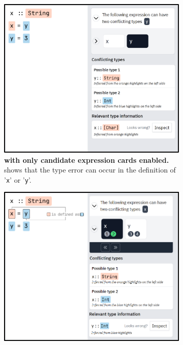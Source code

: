 \begin{figure}
    \centering
    \begin{subfigure}[b]{\linewidth}
        \centering
        \includegraphics[width=\linewidth]{images/intro-expression.pdf}
        \caption{
            \textbf{\chameleon{} with only candidate expression cards enabled.}
            \chameleon{} shows that the type error can
            occur in the definition of '\texttt{x}' or '\texttt{y}'.
        }
        \label{fig:expression}
    \end{subfigure}
    \hfill
    \begin{subfigure}[b]{\linewidth}
        \centering
        \includegraphics[width=\linewidth]{images/intro-deductionstep.pdf}

\end{subfigure}
\end{figure}
